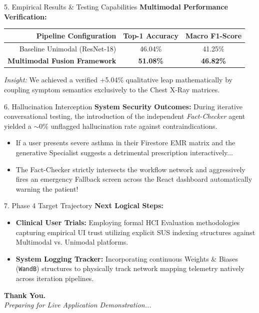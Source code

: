 \documentclass[aspectratio=169, 10pt]{beamer}
\begin{document}
\begin{frame}{5. Empirical Results \& Testing Capabilities}
    \textbf{Multimodal Performance Verification:}
    \begin{table}[]
        \centering
        \begin{tabular}{r c c}
            \toprule
            \textbf{Pipeline Configuration} & \textbf{Top-1 Accuracy} & \textbf{Macro F1-Score} \\
            \midrule
            Baseline Unimodal (ResNet-18) & 46.04\% & 41.25\% \\
            \textbf{Multimodal Fusion Framework} & \textbf{51.08\%} & \textbf{46.82\%} \\
            \bottomrule
        \end{tabular}
    \end{table}
    \vspace{0.3cm}
    \textit{Insight:} We achieved a verified +5.04\% qualitative leap mathematically by coupling symptom semantics exclusively to the Chest X-Ray matrices. 
\end{frame}

\begin{frame}{6. Hallucination Interception}
    \textbf{System Security Outcomes:}
    During iterative conversational testing, the introduction of the independent \textit{Fact-Checker} agent yielded a $\sim 0\%$ unflagged hallucination rate against contraindications. 
    \begin{itemize}
        \item If a user presents severe asthma in their Firestore EMR matrix and the generative Specialist suggests a detrimental prescription interactively... 
        \item The Fact-Checker strictly intersects the workflow network and aggressively fires an emergency Fallback screen across the React dashboard automatically warning the patient!
    \end{itemize}
\end{frame}

\begin{frame}{7. Phase 4 Target Trajectory}
    \textbf{Next Logical Steps:}
    \begin{itemize}
        \item \textbf{Clinical User Trials:} Employing formal HCI Evaluation methodologies capturing empirical UI trust utilizing explicit SUS indexing structures against Multimodal vs. Unimodal platforms.
        \item \textbf{System Logging Tracker:} Incorporating continuous Weights \& Biases (\texttt{WandB}) structures to physically track network mapping telemetry natively across iteration pipelines.
    \end{itemize}
    \vspace{0.5cm}
    \centering \textbf{Thank You.} \\
    \textit{Preparing for Live Application Demonstration...}
\end{frame}
\end{document}
